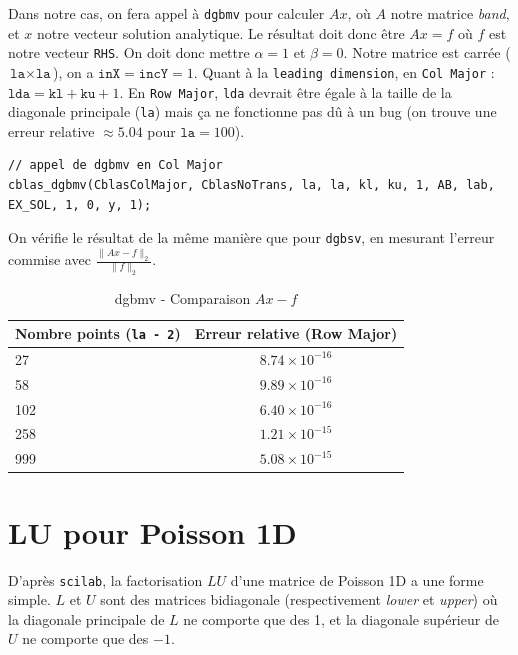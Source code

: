 \documentclass{article}
\begin{document}
Dans notre cas, on fera appel à \texttt{dgbmv} pour calculer \(Ax\), où $A$ notre matrice \textit{band}, et $x$ notre vecteur solution analytique. Le résultat doit donc être \(Ax = f\) où $f$ est notre vecteur \texttt{RHS}. On doit donc mettre $\alpha = 1$ et $\beta = 0$. Notre matrice est carrée ($\texttt{la} \times \texttt{la}$), on a $\texttt{inX} = \texttt{incY} = 1$. Quant à la \texttt{leading dimension}, en \texttt{Col Major} : $\texttt{lda} = \texttt{kl} + \texttt{ku} + 1$. En \texttt{Row Major}, \texttt{lda} devrait être égale à la taille de la diagonale principale (\texttt{la}) mais ça ne fonctionne pas dû à un bug (on trouve une erreur relative $\approx 5.04$ pour $\texttt{la}=100$).
\begin{scriptsize}
\begin{verbatim}
// appel de dgbmv en Col Major
cblas_dgbmv(CblasColMajor, CblasNoTrans, la, la, kl, ku, 1, AB, lab, EX_SOL, 1, 0, y, 1);
\end{verbatim}
\end{scriptsize}

On vérifie le résultat de la même manière que pour \texttt{dgbsv}, en mesurant l'erreur commise avec \(\frac{\lVert Ax - f \rVert_2}{\lVert f \rVert_2}\).

 \begin{table}[H]
\caption{dgbmv - Comparaison $Ax - f$}
\centering
\renewcommand*\arraystretch{1.1}
\begin{tabular}{|l|c|}
  \hline
  Nombre points (\texttt{la - 2}) & Erreur relative (Row Major) \\
  \hline
	27	&	\(8.74 \times 10^{-16}\) \\
	58	&	\(9.89 \times 10^{-16}\) \\
	102	&	\(6.40 \times 10^{-16}\) \\
	258	&	\(1.21 \times 10^{-15}\) \\
	999	&	\(5.08 \times 10^{-15}\) \\
  \hline
\end{tabular}
\end{table}

\section{LU pour Poisson 1D}

D'après \texttt{scilab}, la factorisation $LU$ d'une matrice de Poisson 1D a une forme simple. $L$ et $U$ sont des matrices bidiagonale (respectivement \textit{lower} et \textit{upper}) où la diagonale principale de $L$ ne comporte que des 1, et la diagonale supérieur de $U$ ne comporte que des $-1$.
\end{document}
